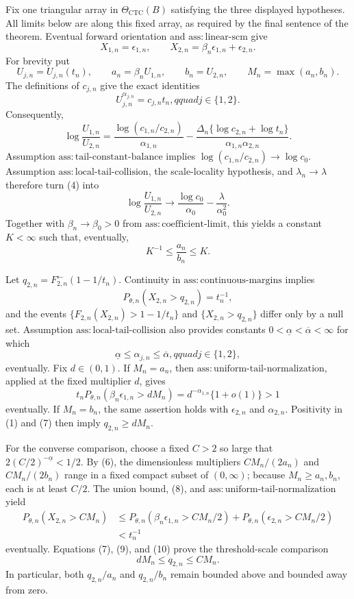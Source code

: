 Fix one triangular array in \(\Theta_{\mathrm{CTC}}(B)\) satisfying the three displayed hypotheses.  All limits below are along this fixed array, as required by the final sentence of the theorem.  Eventual forward orientation and \(\mathrm{ass{:}linear\text{-}scm}\) give
\[
X_{1,n}=\epsilon_{1,n},\qquad X_{2,n}=\beta_n\epsilon_{1,n}+\epsilon_{2,n}.
\tag{1}
\]
For brevity put
\[
U_{j,n}=U_{j,n}(t_n),\qquad a_n=\beta_nU_{1,n},\qquad b_n=U_{2,n},\qquad M_n=\max(a_n,b_n).
\tag{2}
\]
The definitions of \(c_{j,n}\) give the exact identities
\[
U_{j,n}^{\alpha_{j,n}}=c_{j,n}t_n,qquad j\in\{1,2\}.
\tag{3}
\]
Consequently,
\[
\log\frac{U_{1,n}}{U_{2,n}}
=\frac{\log(c_{1,n}/c_{2,n})}{\alpha_{1,n}}
-\frac{\Delta_n\{\log c_{2,n}+\log t_n\}}
{\alpha_{1,n}\alpha_{2,n}}.
\tag{4}
\]
Assumption \(\mathrm{ass{:}tail\text{-}constant\text{-}balance}\) implies \(\log(c_{1,n}/c_{2,n})\to\log c_0\).  Assumption \(\mathrm{ass{:}local\text{-}tail\text{-}collision}\), the scale-locality hypothesis, and \(\lambda_n\to\lambda\) therefore turn (4) into
\[
\log\frac{U_{1,n}}{U_{2,n}}
\longrightarrow \frac{\log c_0}{\alpha_0}-\frac{\lambda}{\alpha_0^2}.
\tag{5}
\]
Together with \(\beta_n\to\beta_0>0\) from \(\mathrm{ass{:}coefficient\text{-}limit}\), this yields a constant \(K<\infty\) such that, eventually,
\[
K^{-1}\leq \frac{a_n}{b_n}\leq K.
\tag{6}
\]

Let \(q_{2,n}=F_{2,n}^{\leftarrow}(1-1/t_n)\).  Continuity in \(\mathrm{ass{:}continuous\text{-}margins}\) implies
\[
P_{\theta,n}(X_{2,n}>q_{2,n})=t_n^{-1},
\tag{7}
\]
and the events \(\{F_{2,n}(X_{2,n})>1-1/t_n\}\) and \(\{X_{2,n}>q_{2,n}\}\) differ only by a null set.  Assumption \(\mathrm{ass{:}local\text{-}tail\text{-}collision}\) also provides constants \(0<\underline\alpha<\overline\alpha<\infty\) for which
\[
\underline\alpha\leq\alpha_{j,n}\leq\overline\alpha,qquad j\in\{1,2\},
\tag{8}
\]
eventually.  Fix \(d\in(0,1)\).  If \(M_n=a_n\), then \(\mathrm{ass{:}uniform\text{-}tail\text{-}normalization}\), applied at the fixed multiplier \(d\), gives
\[
t_nP_{\theta,n}(\beta_n\epsilon_{1,n}>dM_n)
=d^{-\alpha_{1,n}}\{1+o(1)\}>1
\tag{9}
\]
eventually.  If \(M_n=b_n\), the same assertion holds with \(\epsilon_{2,n}\) and \(\alpha_{2,n}\).  Positivity in (1) and (7) then imply \(q_{2,n}\geq dM_n\).

For the converse comparison, choose a fixed \(C>2\) so large that \(2(C/2)^{-\underline\alpha}<1/2\).  By (6), the dimensionless multipliers \(CM_n/(2a_n)\) and \(CM_n/(2b_n)\) range in a fixed compact subset of \((0,\infty)\); because \(M_n\geq a_n,b_n\), each is at least \(C/2\).  The union bound, (8), and \(\mathrm{ass{:}uniform\text{-}tail\text{-}normalization}\) yield
\[
\begin{split}
P_{\theta,n}(X_{2,n}>CM_n)
&\leq P_{\theta,n}(\beta_n\epsilon_{1,n}>CM_n/2)
+P_{\theta,n}(\epsilon_{2,n}>CM_n/2)\\
&<t_n^{-1}
\end{split}
\tag{10}
\]
eventually.  Equations (7), (9), and (10) prove the threshold-scale comparison
\[
dM_n\leq q_{2,n}\leq CM_n.
\tag{11}
\]
In particular, both \(q_{2,n}/a_n\) and \(q_{2,n}/b_n\) remain bounded above and bounded away from zero.

